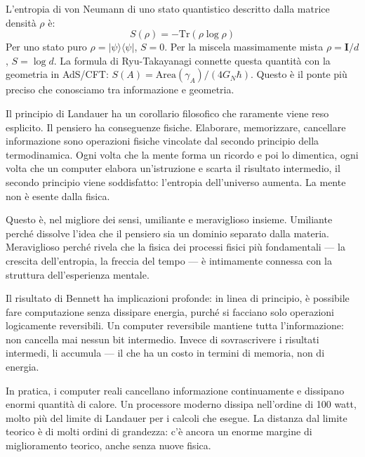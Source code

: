 \documentclass[12pt,a4paper,openany]{book}
\newcommand{\sezione}[1]{\vspace{1.2em}{\large\bfseries #1}\vspace{0.5em}\par}
\begin{document}
\sezione{L'entropia di von Neumann e la geometria}

L'entropia di von Neumann di uno stato quantistico descritto dalla matrice densità $\rho$ è:
\[
S(\rho) = -\mathrm{Tr}(\rho\log\rho)
\]
Per uno stato puro $\rho = |\psi\rangle\langle\psi|$, $S = 0$. Per la miscela massimamente mista $\rho = \mathbf{I}/d$, $S = \log d$. La formula di Ryu-Takayanagi connette questa quantità con la geometria in AdS/CFT: $S(A) = \mathrm{Area}(\gamma_A)/(4G_N\hbar)$. Questo è il ponte più preciso che conosciamo tra informazione e geometria.

\sezione{Una connessione sottile: la mente e il secondo principio}

Il principio di Landauer ha un corollario filosofico che raramente viene reso esplicito. Il pensiero ha conseguenze fisiche. Elaborare, memorizzare, cancellare informazione sono operazioni fisiche vincolate dal secondo principio della termodinamica. Ogni volta che la mente forma un ricordo e poi lo dimentica, ogni volta che un computer elabora un'istruzione e scarta il risultato intermedio, il secondo principio viene soddisfatto: l'entropia dell'universo aumenta. La mente non è esente dalla fisica.

Questo è, nel migliore dei sensi, umiliante e meraviglioso insieme. Umiliante perché dissolve l'idea che il pensiero sia un dominio separato dalla materia. Meraviglioso perché rivela che la fisica dei processi fisici più fondamentali — la crescita dell'entropia, la freccia del tempo — è intimamente connessa con la struttura dell'esperienza mentale.

\sezione{La computazione reversibile e i limiti termodinamici del pensiero}

Il risultato di Bennett ha implicazioni profonde: in linea di principio, è possibile fare computazione senza dissipare energia, purché si facciano solo operazioni logicamente reversibili. Un computer reversibile mantiene tutta l'informazione: non cancella mai nessun bit intermedio. Invece di sovrascrivere i risultati intermedi, li accumula --- il che ha un costo in termini di memoria, non di energia.

In pratica, i computer reali cancellano informazione continuamente e dissipano enormi quantità di calore. Un processore moderno dissipa nell'ordine di 100 watt, molto più del limite di Landauer per i calcoli che esegue. La distanza dal limite teorico è di molti ordini di grandezza: c'è ancora un enorme margine di miglioramento teorico, anche senza nuove fisica.
\end{document}
